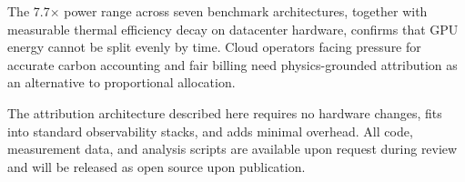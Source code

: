 \documentclass[conference]{IEEEtran}
\begin{document}
The 7.7$\times$ power range across seven benchmark architectures, together with measurable thermal efficiency decay on datacenter hardware, confirms that GPU energy cannot be split evenly by time. Cloud operators facing pressure for accurate carbon accounting and fair billing need physics-grounded attribution as an alternative to proportional allocation.

The attribution architecture described here requires no hardware changes, fits into standard observability stacks, and adds minimal overhead. All code, measurement data, and analysis scripts are available upon request during review and will be released as open source upon publication.





\end{document}
